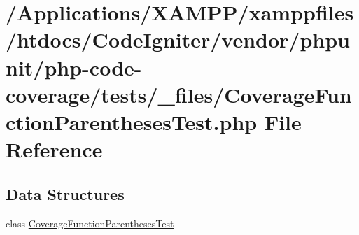 \hypertarget{php-code-coverage_2tests_2__files_2_coverage_function_parentheses_test_8php}{}\section{/\+Applications/\+X\+A\+M\+P\+P/xamppfiles/htdocs/\+Code\+Igniter/vendor/phpunit/php-\/code-\/coverage/tests/\+\_\+files/\+Coverage\+Function\+Parentheses\+Test.php File Reference}
\label{php-code-coverage_2tests_2__files_2_coverage_function_parentheses_test_8php}
\subsection*{Data Structures}
\begin{DoxyCompactItemize}
\item 
class \mbox{\hyperlink{class_coverage_function_parentheses_test}{Coverage\+Function\+Parentheses\+Test}}
\end{DoxyCompactItemize}
